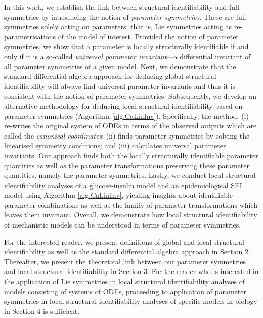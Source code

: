 \documentclass[12pt]{article}
\begin{document}
In this work, we establish the link between structural identifiability and full symmetries by introducing the notion of \textit{parameter symmetries}. These are full symmetries solely acting on parameters; that is, Lie symmetries acting as re-parametrisations of the model of interest. Provided the notion of parameter symmetries, we show that a parameter is locally structurally identifiable if and only if it is a so-called \textit{universal parameter invariant}---a differential invariant of all parameter symmetries of a given model. Next, we demonstrate that the standard differential algebra approach for deducing global structural identifiability will always find universal parameter invariants and thus it is consistent with the notion of parameter symmetries. Subsequently, we develop an alternative methodology for deducing local structural identifiability based on parameter symmetries (Algorithm \ref{alg:CaLinInv}). Specifically, the method: (i) re-writes the original system of ODEs in terms of the observed outputs which are called the \emph{canonical coordinates}; (ii) finds parameter symmetries by solving the linearised symmetry conditions; and (iii) calculates universal parameter invariants. Our approach finds both the locally structurally identifiable parameter quantities as well as the parameter transformations preserving these parameter quantities, namely the parameter symmetries. Lastly, we conduct local structural identifiability analyses of a glucose-insulin model and an epidemiological SEI model using Algorithm \ref{alg:CaLinInv}, yielding insights about identifiable parameter combinations as well as the family of parameter transformations which leaves them invariant. Overall, we demonstrate how local structural identifiability of mechanistic models can be understood in terms of parameter symmetries. 

For the interested reader, we present definitions of global and local structural identifiability as well as the standard differential algebra approach in Section 2. Thereafter, we present the theoretical link between our parameter symmetries and local structural identifiability in Section 3. For the reader who is interested in the application of Lie symmetries in local structural identifiability analyses of models consisting of systems of ODEs, proceeding to application of parameter symmetries in local structural identifiability analyses of specific models in biology in Section 4 is sufficient.


\end{document}
